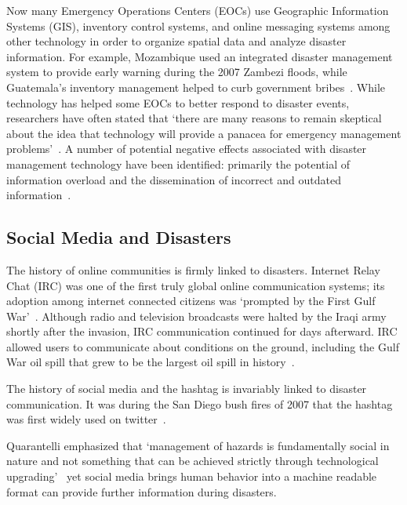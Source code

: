 Now many Emergency Operations Centers (EOCs) use Geographic Information Systems
(GIS), inventory control systems, and online messaging systems among other
technology in order to organize spatial data and analyze disaster information.
For example, Mozambique used an integrated disaster management system to provide
early warning during the 2007  Zambezi floods, while Guatemala's inventory
management helped to curb government bribes~\cite{aminDataNaturalDisasters2008}.
While technology has helped some EOCs to better respond to disaster events,
researchers have often stated that `there are many reasons to remain skeptical
about the idea that technology will provide a panacea for emergency management
problems'~\cite{tzemosUseGISFederal1995, tierneyFacingUnexpectedDisaster2001,
perryNaturalDisasterManagement2007}. A number of potential negative effects
associated with disaster management technology have been identified: primarily
the potential of information overload and the dissemination of incorrect and
outdated information~\cite{quarantelliProblematicalAspectsInformation1997,
flentgeDesigningContextAwareHCI}.

\subsection{Social Media and Disasters}\label{chap2:socialMedia}
The history of online communities is firmly linked to disasters. Internet
Relay Chat (IRC) was one of the first truly global online communication systems;
its adoption among internet connected citizens was `prompted by the First Gulf
War'~\cite{salazarHashtagsAnnotatedHistory2017}. Although radio and
television broadcasts were halted by the Iraqi army shortly after the invasion,
IRC communication continued for days afterward. IRC allowed users to communicate
about conditions on the ground, including the Gulf War oil spill that grew to be
the largest oil spill in history~\cite{Timeline20Years2010}.

The history of social media and the hashtag is invariably linked to disaster
communication.  It was during the San Diego bush fires of 2007 that the hashtag
was first widely used on twitter~\cite{salazarHashtagsAnnotatedHistory2017}.

Quarantelli emphasized that  `management of hazards is fundamentally social in
nature and not something that can be achieved strictly through technological
upgrading'~\cite{tierneyFacingUnexpectedDisaster2001} yet social media brings
human behavior into a machine readable format can provide further information
during disasters.

